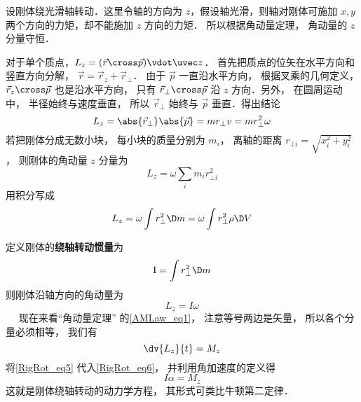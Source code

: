 

设刚体绕光滑轴转动．这里令轴的方向为 $z$，假设轴光滑，则轴对刚体可施加 $x, y$ 两个方向的力矩，却不能施加 $z$ 方向的力矩． 所以根据角动量定理， 角动量的 $z$ 分量守恒．

对于单个质点，$L_z = ( \vec r \cross \vec p ) \vdot \uvec z$． 首先把质点的位矢在水平方向和竖直方向分解， $\vec r = {\vec r_z} + {\vec r_ \bot }$． 由于 $\vec p$ 一直沿水平方向， 根据叉乘的几何定义， ${\vec r_z} \cross \vec p$ 也是沿水平方向， 只有 ${\vec r_ \bot } \cross \vec p$ 沿 $z$ 方向．另外， 在圆周运动中， 半径始终与速度垂直， 所以 ${\vec r_ \bot }$ 始终与 $\vec p$ 垂直．得出结论
\begin{equation}
{L_z} = \abs{\vec r_\bot} \abs{\vec p} = m {r_ \bot } v = mr_ \bot ^2\omega 
\end{equation}
若把刚体分成无数小块， 每小块的质量分别为 $m_i$， 离轴的距离 $r_{\bot i} = \sqrt {x_i^2 + y_i^2} $， 则刚体的角动量 $z$ 分量为
\begin{equation}
L_z = \omega \sum_i m_i r_{ \bot i}^2
\end{equation}
用积分写成
\begin{equation}
{L_z} = \omega \int {r_ \bot ^2\D m} = \omega \int {r_ \bot ^2\rho  \D V} 
\end{equation}

定义刚体的\textbf{绕轴转动惯量}为
\begin{equation}
{\rm{I}} = \int {r_ \bot ^2\D m} 
\end{equation}
则刚体沿轴方向的角动量为
\begin{equation}\label{RigRot_eq5}
{L_z} = I\omega 
\end{equation}
 
现在来看“角动量定理” 的\autoref{AMLaw_eq1}， 注意等号两边是矢量， 所以各个分量必须相等， 我们有
\begin{equation}\label{RigRot_eq6}
\dv{L_z}{t} = M_z
\end{equation}
将\autoref{RigRot_eq5} 代入\autoref{RigRot_eq6}， 并利用角加速度的定义得
\begin{equation}
I\alpha = M_z
\end{equation}
这就是刚体绕轴转动的动力学方程， 其形式可类比牛顿第二定律．











